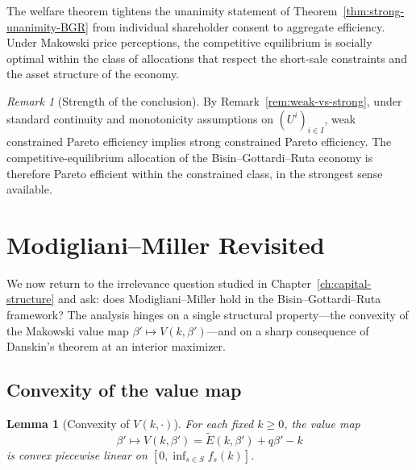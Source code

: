 \documentclass[11pt,a4paper,oneside]{book}
\def\geq{\geqslant}
\theoremstyle{plain}
\newtheorem{lemma}[theorem]{Lemma}
\theoremstyle{definition}
\theoremstyle{remark}
\newtheorem{remark}[theorem]{Remark}
\numberwithin{equation}{chapter}
\begin{document}
The welfare theorem tightens the unanimity statement of Theorem~\ref{thm:strong-unanimity-BGR} from individual shareholder consent to aggregate efficiency.
Under Makowski price perceptions, the competitive equilibrium is socially optimal within the class of allocations that respect the short-sale constraints and the asset structure of the economy.

\begin{remark}[Strength of the conclusion]\label{rem:strength-of-conclusion}
By Remark~\ref{rem:weak-vs-strong}, under standard continuity and monotonicity assumptions on $(U^i)_{i \in I}$, weak constrained Pareto efficiency implies strong constrained Pareto efficiency.
The competitive-equilibrium allocation of the Bisin--Gottardi--Ruta economy is therefore Pareto efficient within the constrained class, in the strongest sense available.
\end{remark}

\section{Modigliani--Miller Revisited}
\label{sec:MM-BGR}

We now return to the irrelevance question studied in Chapter~\ref{ch:capital-structure} and ask: does Modigliani--Miller hold in the Bisin--Gottardi--Ruta framework?
The analysis hinges on a single structural property---the convexity of the Makowski value map $\beta' \mapsto V(k, \beta')$---and on a sharp consequence of Danskin's theorem at an interior maximizer.

\subsection{Convexity of the value map}

\begin{lemma}[Convexity of $V(k, \cdot)$]\label{lem:V-convex}
For each fixed $k \geq 0$, the value map
\begin{equation*}
  \beta' \mapsto V(k, \beta') = \widetilde{E}(k, \beta') + q \beta' - k
\end{equation*}
is convex piecewise linear on $[0, \inf_{s \in S} f_s(k)]$.
\end{lemma}
\end{document}
